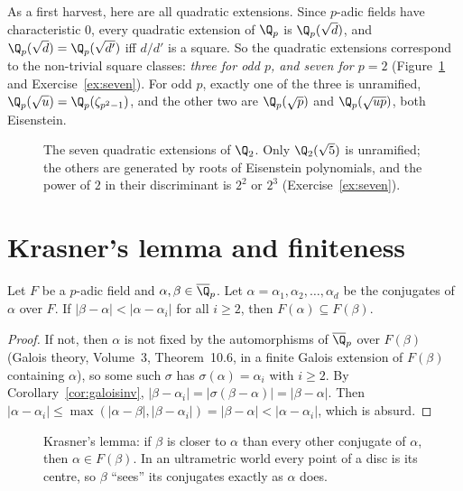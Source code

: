 As a first harvest, here are all quadratic extensions. Since $p$-adic fields have characteristic $0$, every quadratic extension of
$\Q_p$ is $\Q_p(\sqrt d)$, and $\Q_p(\sqrt d)=\Q_p(\sqrt{d'})$ iff $d/d'$ is a square. So the quadratic extensions correspond to the
non-trivial square classes: \emph{three for odd $p$, and seven for $p=2$} (Figure~\ref{fig:quadratic2} and Exercise~\ref{ex:seven}).
For odd $p$, exactly one of the three is unramified, $\Q_p(\sqrt u)=\Q_p(\zeta_{p^2-1})$, and the other two are $\Q_p(\sqrt p)$ and
$\Q_p(\sqrt{up})$, both Eisenstein.

\begin{figure}[ht]
\centering
{}
\caption{The seven quadratic extensions of $\Q_2$. Only $\Q_2(\sqrt5)$ is unramified; the others are generated by roots of
Eisenstein polynomials, and the power of $2$ in their discriminant is $2^2$ or $2^3$ (Exercise~\ref{ex:seven}).}
\label{fig:quadratic2}
\end{figure}

\section{Krasner's lemma and finiteness}

\begin{lemma}[Krasner, 1946]\label{lem:krasner}
Let $F$ be a $p$-adic field and $\alpha,\beta\in\overline{\Q}_p$. Let $\alpha=\alpha_1,\alpha_2,\dots,\alpha_d$ be the conjugates of
$\alpha$ over $F$. If $|\beta-\alpha|<|\alpha-\alpha_i|$ for all $i\ge2$, then $F(\alpha)\subseteq F(\beta)$.
\end{lemma}
\begin{proof}
If not, then $\alpha$ is not fixed by the automorphisms of $\overline{\Q}_p$ over $F(\beta)$ (Galois theory, Volume~3, Theorem~10.6,
in a finite Galois extension of $F(\beta)$ containing $\alpha$), so some such $\sigma$ has $\sigma(\alpha)=\alpha_i$ with $i\ge2$.
By Corollary~\ref{cor:galoisinv}, $|\beta-\alpha_i|=|\sigma(\beta-\alpha)|=|\beta-\alpha|$. Then
$|\alpha-\alpha_i|\le\max(|\alpha-\beta|,|\beta-\alpha_i|)=|\beta-\alpha|<|\alpha-\alpha_i|$, which is absurd.
\end{proof}

\begin{figure}[ht]
\centering
{}
\caption{Krasner's lemma: if $\beta$ is closer to $\alpha$ than every other conjugate of $\alpha$, then $\alpha\in F(\beta)$. In
an ultrametric world every point of a disc is its centre, so $\beta$ ``sees'' its conjugates exactly as $\alpha$ does.}
\label{fig:krasner}
\end{figure}

